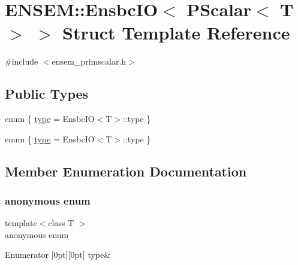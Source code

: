 \hypertarget{structENSEM_1_1EnsbcIO_3_01PScalar_3_01T_01_4_01_4}{}\section{E\+N\+S\+EM\+:\+:Ensbc\+IO$<$ P\+Scalar$<$ T $>$ $>$ Struct Template Reference}
\label{structENSEM_1_1EnsbcIO_3_01PScalar_3_01T_01_4_01_4}


{\ttfamily \#include $<$ensem\+\_\+primscalar.\+h$>$}

\subsection*{Public Types}
\begin{DoxyCompactItemize}
\item 
enum \{ \mbox{\hyperlink{structENSEM_1_1EnsbcIO_3_01PScalar_3_01T_01_4_01_4_ade348c43ef0a6a0df9afcee5dadba957adebfddcd965322a309c382c575cb6970}{type}} = Ensbc\+IO$<$T$>$\+:\+:type
 \}
\item 
enum \{ \mbox{\hyperlink{structENSEM_1_1EnsbcIO_3_01PScalar_3_01T_01_4_01_4_ade348c43ef0a6a0df9afcee5dadba957adebfddcd965322a309c382c575cb6970}{type}} = Ensbc\+IO$<$T$>$\+:\+:type
 \}
\end{DoxyCompactItemize}


\subsection{Member Enumeration Documentation}
\mbox{\label{structENSEM_1_1EnsbcIO_3_01PScalar_3_01T_01_4_01_4_ade348c43ef0a6a0df9afcee5dadba957}} 
\subsubsection{\texorpdfstring{anonymous enum}{anonymous enum}}
{\footnotesize\ttfamily template$<$class T $>$ \\
anonymous enum}

\begin{DoxyEnumFields}{Enumerator}
[0pt][0pt]{}\mbox{\label{structENSEM_1_1EnsbcIO_3_01PScalar_3_01T_01_4_01_4_ade348c43ef0a6a0df9afcee5dadba957adebfddcd965322a309c382c575cb6970}} 
type&\\
\hline

\end{DoxyEnumFields}
\mbox{\label{structENSEM_1_1EnsbcIO_3_01PScalar_3_01T_01_4_01_4_aea593b64df001e284963f1af5cf466ff}} 
